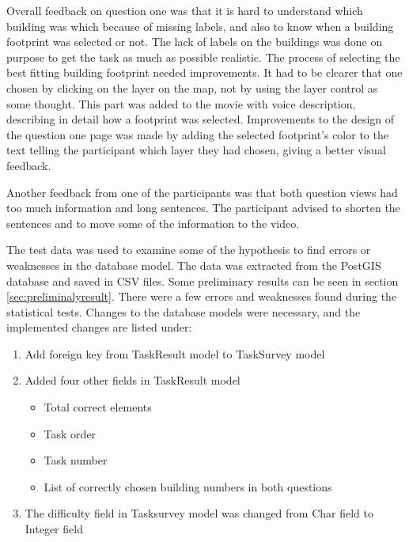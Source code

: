 Overall feedback on question one was that it is hard to understand which building was which because of missing labels, and also to know when a building footprint was selected or not. The lack of labels on the buildings was done on purpose to get the task as much as possible realistic. The process of selecting the best fitting building footprint needed improvements. It had to be clearer that one chosen by clicking on the layer on the map, not by using the layer control as some thought. This part was added to the movie with voice description, describing in detail how a footprint was selected. Improvements to the design of the question one page was made by adding the selected footprint's color to the text telling the participant which layer they had chosen, giving a better visual feedback.

Another feedback from one of the participants was that both question views had too much information and long sentences. The participant advised to shorten the sentences and to move some of the information to the video. 

The test data was used to examine some of the hypothesis to find errors or weaknesses in the database model. The data was extracted from the PostGIS database and saved in CSV files. Some preliminary results can be seen in section \ref{sec:preliminalyresult}. There were a few errors and weaknesses found during the statistical tests. Changes to the database models were necessary, and the implemented changes are listed under: 

\begin{enumerate}
	\item Add foreign key from TaskResult model to TaskSurvey model
	\item Added four other fields in TaskResult model
	\begin{itemize}
		\item Total correct elements 
		\item Task order
		\item Task number
		\item List of correctly chosen building numbers in both questions
	\end{itemize}
	\item The difficulty field in Tasksurvey model was changed from Char field to Integer field
\end{enumerate}


